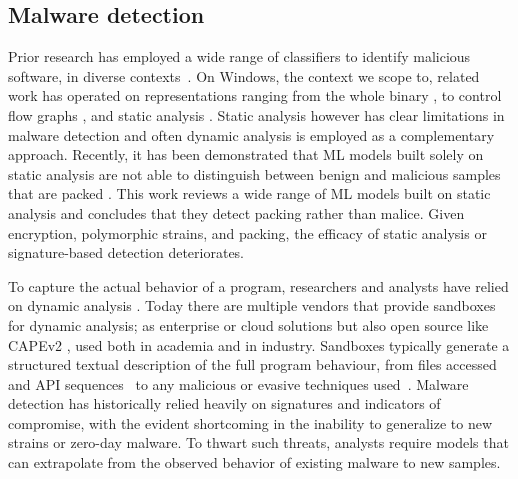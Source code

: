 \subsection{Malware detection}
Prior research has employed a wide range of classifiers to identify malicious software, in diverse contexts~\cite{abusitta2021malware}. 
On Windows, the context we scope to, related work has operated on representations ranging from the whole binary \cite{raff2018malware}, to control flow graphs \cite{alasmary2020soteria}, and static analysis \cite{christodorescu2003static}.
Static analysis however has clear limitations in malware detection and often dynamic analysis is employed as a complementary approach.
Recently, it has been demonstrated that ML models built solely on static analysis are not able to distinguish between benign and malicious samples that are packed \cite{aghakhani2020malware}.
This work reviews a wide range of ML models built on static analysis and concludes that they detect packing rather than malice.
Given encryption, polymorphic strains, and packing, the efficacy of static analysis or signature-based detection deteriorates.

To capture the actual behavior of a program, researchers and analysts have relied on dynamic analysis \cite{cornelissen2009systematic}.
Today there are multiple vendors that provide sandboxes for dynamic analysis; as enterprise or cloud solutions but also open source like CAPEv2 \cite{CAPEv2,CUCKOO,DRAKVUF}, used both in academia and in industry.
Sandboxes typically generate a structured textual description of the full program behaviour, from files accessed and API sequences~\cite{rosenberg2018generic,rosenberg2021sequence,pennington2014glove} to any malicious or evasive techniques used~\cite{trinius2009malware,galloro2022systematical,maffia2021longitudinal}.
Malware detection has historically relied heavily on signatures and indicators of compromise, with the evident shortcoming in the inability to generalize to new strains or zero-day malware.
To thwart such threats, analysts require models that can extrapolate from the observed behavior of existing malware to new samples.


